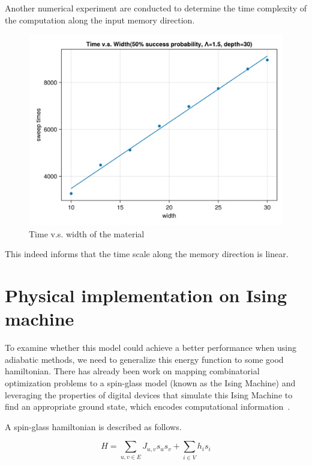 \documentclass[twocolumn,superscriptaddress,english,showpacs,longbibliography]{revtex4-2}
\begin{document}
Another numerical experiment are conducted to determine the time complexity of the computation along the input memory direction. 

\begin{figure}[H]
    \centering
    \includegraphics[width=\columnwidth,keepaspectratio]{../notes/images/toy_model_time_vs_width_wave_packet.png}
    \caption{Time v.s. width of the material}
\end{figure}

This indeed informs that the time scale along the memory direction is linear.

\section{Physical implementation on Ising machine}\label{spin-glass}

To examine whether this model could achieve a better performance when
using adiabatic methods, we need to generalize this energy function to
some good hamiltonian. There has already been work on mapping
combinatorial optimization problems to a spin-glass model (known as the
Ising Machine) and leveraging the properties of digital devices that
simulate this Ising Machine to find an appropriate ground state, which
encodes computational information~\cite{Aadit2022,Bybee2023}.

A spin-glass hamiltonian is described as follows.

\begin{equation}
H = \sum_{u,v \in E} J_{u,v}s_us_v + \sum_{i\in V}h_i s_i
\end{equation}
\end{document}
